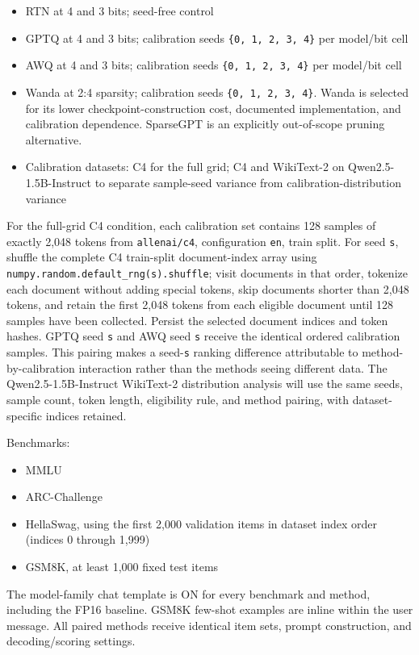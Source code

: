 \begin{itemize}
\item RTN at 4 and 3 bits; seed-free control
\item GPTQ at 4 and 3 bits; calibration seeds \texttt{\{0, 1, 2, 3, 4\}} per model/bit cell
\item AWQ at 4 and 3 bits; calibration seeds \texttt{\{0, 1, 2, 3, 4\}} per model/bit cell
\item Wanda at 2:4 sparsity; calibration seeds \texttt{\{0, 1, 2, 3, 4\}}. Wanda is selected for its lower checkpoint-construction cost, documented implementation, and calibration dependence. SparseGPT is an explicitly out-of-scope pruning alternative.
\item Calibration datasets: C4 for the full grid; C4 and WikiText-2 on Qwen2.5-1.5B-Instruct to separate sample-seed variance from calibration-distribution variance
\end{itemize}
For the full-grid C4 condition, each calibration set contains 128 samples of exactly 2,048 tokens from \texttt{allenai/\allowbreak{}c4}, configuration \texttt{en}, train split. For seed \texttt{s}, shuffle the complete C4 train-split document-index array using \texttt{numpy.random.default\_rng(s).shuffle}; visit documents in that order, tokenize each document without adding special tokens, skip documents shorter than 2,048 tokens, and retain the first 2,048 tokens from each eligible document until 128 samples have been collected. Persist the selected document indices and token hashes. GPTQ seed \texttt{s} and AWQ seed \texttt{s} receive the identical ordered calibration samples. This pairing makes a seed-\texttt{s} ranking difference attributable to method-by-calibration interaction rather than the methods seeing different data. The Qwen2.5-1.5B-Instruct WikiText-2 distribution analysis will use the same seeds, sample count, token length, eligibility rule, and method pairing, with dataset-specific indices retained.

Benchmarks:

\begin{itemize}
\item MMLU
\item ARC-Challenge
\item HellaSwag, using the first 2,000 validation items in dataset index order (indices 0 through 1,999)
\item GSM8K, at least 1,000 fixed test items
\end{itemize}
The model-family chat template is ON for every benchmark and method, including the FP16 baseline. GSM8K few-shot examples are inline within the user message. All paired methods receive identical item sets, prompt construction, and decoding/scoring settings.


